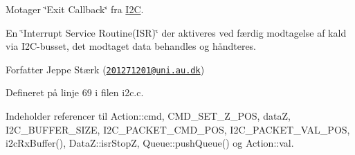 Motager \char`\"{}\+Exit Callback\char`\"{} fra \hyperlink{class_i2_c}{I2C}. 

En \char`\"{}\+Interrupt Service Routine(\+I\+S\+R)\char`\"{} der aktiveres ved færdig modtagelse af kald via I2\+C-\/busset, det modtaget data behandles og håndteres.

\begin{DoxyAuthor}{Forfatter}
Jeppe Stærk (\href{mailto:201271201@uni.au.dk}{\tt 201271201@uni.\+au.\+dk}) 
\end{DoxyAuthor}


Defineret på linje 69 i filen i2c.\+c.



Indeholder referencer til Action\+::cmd, C\+M\+D\+\_\+\+S\+E\+T\+\_\+\+Z\+\_\+\+P\+OS, dataZ, I2\+C\+\_\+\+B\+U\+F\+F\+E\+R\+\_\+\+S\+I\+ZE, I2\+C\+\_\+\+P\+A\+C\+K\+E\+T\+\_\+\+C\+M\+D\+\_\+\+P\+OS, I2\+C\+\_\+\+P\+A\+C\+K\+E\+T\+\_\+\+V\+A\+L\+\_\+\+P\+OS, i2c\+Rx\+Buffer(), Data\+Z\+::isr\+StopZ, Queue\+::push\+Queue() og Action\+::val.


